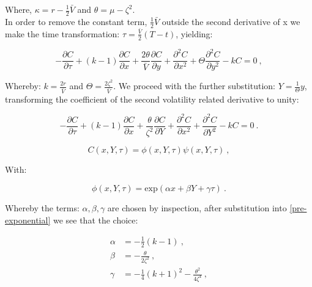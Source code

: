 \documentclass[english,12pt]{article}
\begin{document}
Where, $\kappa = r - \frac{1}{2}\bar{V}$ and $\theta = \mu - \zeta^2$.
\\
\indent In order to remove the constant term, $\frac{1}{2}\bar{V}$ outside the second derivative of x we make the time transformation: $\tau = \frac{\bar{V}}{2} (T-t)$, yielding: 

\begin{equation}
\label{pre-exponential} -\frac{\partial C}{\partial \tau} + (k - 1)\frac{\partial C}{\partial x} + \frac{2\theta}{\bar{V}}\frac{\partial C}{\partial y} + \frac{\partial^2 C}{\partial x^2} + \Theta\frac{\partial^2 C}{\partial y^2} - kC = 0~,
\end{equation}

Whereby: $k = \frac{2r}{\bar{V}}$ and $\Theta = \frac{2\zeta^2}{\bar{V}}$. We proceed with the further substitution: $Y = \frac{1}{\Theta}y$, transforming the coefficient of the second volatility related derivative to unity:

\begin{equation}
-\frac{\partial C}{\partial \tau} + (k - 1)\frac{\partial C}{\partial x} + \frac{\theta}{\zeta^2}\frac{\partial C}{\partial Y} + \frac{\partial^2 C}{\partial x^2} + \frac{\partial^2 C}{\partial Y^2} - kC = 0~.
\end{equation}

\begin{equation}
C(x,Y,\tau) = \phi(x,Y,\tau)\psi(x,Y,\tau)~,
\end{equation}

With: 

\begin{equation}
\phi(x,Y,\tau) = \text{exp}(\alpha x + \beta Y + \gamma\tau)~.
\end{equation}

Whereby the terms: $\alpha, \beta, \gamma$ are chosen by inspection, after substitution into \ref{pre-exponential} we see that the choice: 

\begin{align}
\alpha &= -\frac{1}{2}(k - 1)~, \\
\beta &= -\frac{\theta}{2\zeta^2}~, \\
\gamma &= -\frac{1}{4}(k + 1)^2 -\frac{\theta^2}{4\zeta^4}~,
\end{align}
\end{document}
